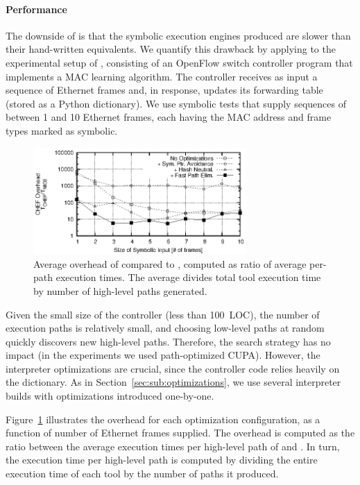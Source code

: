 \paragraph{Performance}

The downside of \chef is that the symbolic execution engines produced are slower than their hand-written equivalents.  We quantify this drawback by applying \chef to the experimental setup of \nicese, consisting of an OpenFlow switch controller program that implements a MAC learning algorithm.  The controller receives as input a sequence of Ethernet frames and, in response, updates its forwarding table (stored as a Python dictionary).  We use symbolic tests that supply sequences of between 1 and 10 Ethernet frames, each having the MAC address and frame types marked as symbolic.

\begin{figure}
  \centering
  \includegraphics[width=3.2in]{figures/evaluation/nice-optimizations}
  \caption{Average overhead of \chef compared to \nicese, computed as ratio of average per-path execution times.  The average divides total tool execution time by number of high-level paths generated.}
  \label{fig:nice-overhead}
\end{figure}

Given the small size of the controller (less than 100~LOC), the number of execution paths is relatively small, and choosing low-level paths at random quickly discovers new high-level paths.  Therefore, the search strategy has no impact (in the experiments we used path-optimized CUPA).  However, the interpreter optimizations are crucial, since the controller code relies heavily on the dictionary.  As in Section~\ref{sec:sub:optimizations}, we use several interpreter builds with optimizations introduced one-by-one.

Figure~\ref{fig:nice-overhead} illustrates the overhead for each optimization configuration, as a function of number of Ethernet frames supplied.  The overhead is computed as the ratio between the average execution times per high-level path of \nicese and \chef.  In turn, the execution time per high-level path is computed by dividing the entire execution time of each tool by the number of paths it produced.

